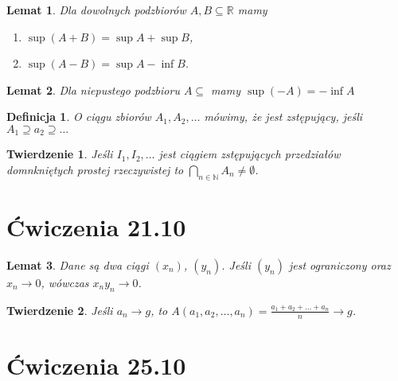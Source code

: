 \documentclass{article}
\newcommand{\R}{\mathbb{R}}
\newcommand{\N}{\mathbb{N}}
\newtheorem{lemma}{Lemat}
\newtheorem*{definition}{Definicja}
\newtheorem{theorem}{Twierdzenie}
\begin{document}
\begin{lemma} %
    Dla dowolnych podzbiorów $A,B \subseteq\R$ mamy
        \begin{enumerate}[label=(\alph*)]
            \item $\sup{(A+B)}=\sup{A}+\sup{B}$,
            \item $\sup{(A-B)}=\sup{A}-\inf{B}$.
        \end{enumerate}
\end{lemma}

\begin{lemma} %
    Dla niepustego podzbioru $A\subseteq$ mamy $\sup{(-A)}=-\inf{A}$
\end{lemma}

\begin{definition} %
O ciągu zbiorów $A_1, A_2,\ldots$ mówimy, że jest zstępujący, jeśli $A_1\supseteq a_2 \supseteq \ldots$
\end{definition}


\begin{theorem} %
    Jeśli $I_1, I_2, \ldots$ jest ciągiem zstępujących przedziałów domnkniętych prostej rzeczywistej
    to $\bigcap_{n\in\N}A_n\ne\emptyset$.
\end{theorem}

                                            \section{Ćwiczenia 21.10}

\begin{lemma}
    Dane są dwa ciągi $(x_n)$, $(y_n)$. Jeśli $(y_n)$ jest ograniczony oraz $x_n\to 0$, wówczas
    $x_n y_n \to 0$.
\end{lemma}

\begin{theorem}
    Jeśli $a_n\to g$, to $A(a_1,a_2,\ldots,a_n)=\frac{a_1+a_2+\ldots+a_n}{n}\to g$.
    \end{theorem}    

                                            \section{Ćwiczenia 25.10}
\end{document}
